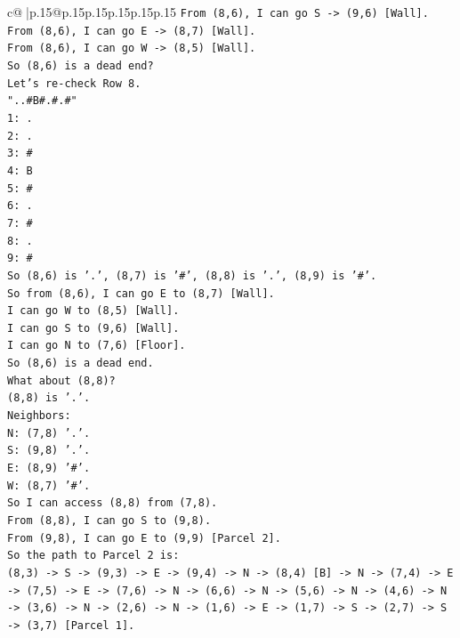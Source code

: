 \documentclass{article}
\begin{document}
{\begin{supertabular}{c@{$\;$}|p{.15\linewidth}@{}p{.15\linewidth}p{.15\linewidth}p{.15\linewidth}p{.15\linewidth}p{.15\linewidth}}
{{{\texttt{From (8,6), I can go S {-}> (9,6) {[}Wall{]}.} \\
\texttt{From (8,6), I can go E {-}> (8,7) {[}Wall{]}.} \\
\texttt{From (8,6), I can go W {-}> (8,5) {[}Wall{]}.} \\
\texttt{So (8,6) is a dead end?} \\
\texttt{Let's re{-}check Row 8.} \\
\texttt{"..\#B\#.\#.\#"} \\
\texttt{1: .} \\
\texttt{2: .} \\
\texttt{3: \#} \\
\texttt{4: B} \\
\texttt{5: \#} \\
\texttt{6: .} \\
\texttt{7: \#} \\
\texttt{8: .} \\
\texttt{9: \#} \\
\texttt{So (8,6) is '.', (8,7) is '\#', (8,8) is '.', (8,9) is '\#'.} \\
\texttt{So from (8,6), I can go E to (8,7) {[}Wall{]}.} \\
\texttt{I can go W to (8,5) {[}Wall{]}.} \\
\texttt{I can go S to (9,6) {[}Wall{]}.} \\
\texttt{I can go N to (7,6) {[}Floor{]}.} \\
\texttt{So (8,6) is a dead end.} \\
\texttt{What about (8,8)?} \\
\texttt{(8,8) is '.'.} \\
\texttt{Neighbors:} \\
\texttt{N: (7,8) '.'.} \\
\texttt{S: (9,8) '.'.} \\
\texttt{E: (8,9) '\#'.} \\
\texttt{W: (8,7) '\#'.} \\
\texttt{So I can access (8,8) from (7,8).} \\
\texttt{From (8,8), I can go S to (9,8).} \\
\texttt{From (9,8), I can go E to (9,9) {[}Parcel 2{]}.} \\
\texttt{So the path to Parcel 2 is:} \\
\texttt{(8,3) {-}> S {-}> (9,3) {-}> E {-}> (9,4) {-}> N {-}> (8,4) {[}B{]} {-}> N {-}> (7,4) {-}> E {-}> (7,5) {-}> E {-}> (7,6) {-}> N {-}> (6,6) {-}> N {-}> (5,6) {-}> N {-}> (4,6) {-}> N {-}> (3,6) {-}> N {-}> (2,6) {-}> N {-}> (1,6) {-}> E {-}> (1,7) {-}> S {-}> (2,7) {-}> S {-}> (3,7) {[}Parcel 1{]}.} \\
}}}
\end{supertabular}}
\end{document}
